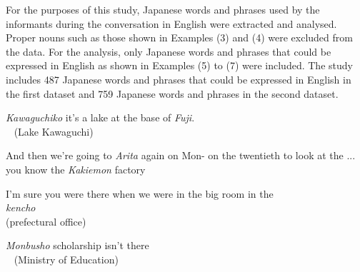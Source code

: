 \documentclass[output=paper]{LSP/langsci}
\begin{document}
For the purposes of this study, Japanese words and phrases used by the informants during the conversation in English were extracted and analysed. Proper nouns such as those shown in Examples (3) and (4) were excluded from the data. For the analysis, only Japanese words and phrases that could be expressed in English as shown in Examples (5) to (7) were included. The study includes 487 Japanese words and phrases that could be expressed in English in the first dataset and 759 Japanese words and phrases in the second dataset.


\ea
{} {\textit{Kawaguchiko}} it's a lake at the base of \textit{Fuji}.\\
{~} {(Lake Kawaguchi)} {~}\\
\z

\vspace*{-.8cm}


\begin{exe}
\label{ex:4}
\ex And then we're going to \textit{Arita} again on Mon- on the twentieth to look at the ... you know the \textit{Kakiemon} factory
\end{exe}


\ea
 {I’m sure you were there when we were in the big room} {in the}\\[.4em]
 {\textit{kencho}}\\
{(prefectural office)}\\
\z


\ea
{} {\textit{Monbusho}} {scholarship isn't there}\\
{~} {(Ministry of Education)} {~}\\
\z

\end{document}
